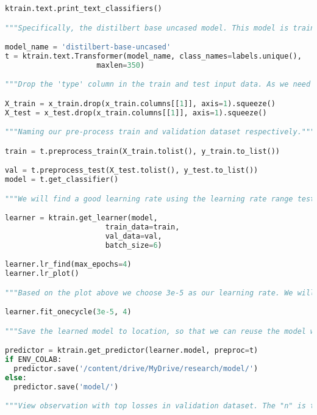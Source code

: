 \begin{lstlisting}[language=Python]
ktrain.text.print_text_classifiers()

"""Specifically, the distilbert base uncased model. This model is trained on uncased English words."""

model_name = 'distilbert-base-uncased'
t = ktrain.text.Transformer(model_name, class_names=labels.unique(),
                     maxlen=350)

"""Drop the 'type' column in the train and test input data. As we need only the domains to train our model. This type is needed in our train and test dataset later on to validate on each specific DGA familytype."""

X_train = x_train.drop(x_train.columns[[1]], axis=1).squeeze()
X_test = x_test.drop(x_train.columns[[1]], axis=1).squeeze()

"""Naming our pre-process train and validation dataset respectively."""

train = t.preprocess_train(X_train.tolist(), y_train.to_list())

val = t.preprocess_test(X_test.tolist(), y_test.to_list())
model = t.get_classifier()

"""We will find a good learning rate using the learning rate range test to provide valuable information about an optimal learnign rate. To point has to be chosen at which the loss starts descending and the point at which the loss stops descending or becomes ragged. For BERT and DistilBERT models the learning rate that Google recommends is between 5e-5 and 2e-5."""

learner = ktrain.get_learner(model,
                       train_data=train,
                       val_data=val,
                       batch_size=6)

learner.lr_find(max_epochs=4)
learner.lr_plot()

"""Based on the plot above we choose 3e-5 as our learning rate. We will fit a model follwing the 1cycle policy."""

learner.fit_onecycle(3e-5, 4)

"""Save the learned model to location, so that we can reuse the model without training our dataset again."""

predictor = ktrain.get_predictor(learner.model, preproc=t)
if ENV_COLAB:
  predictor.save('/content/drive/MyDrive/research/model/')
else: 
  predictor.save('model/')

"""View observation with top losses in validation dataset. The "n" is the amount of top losses we want to observe."""


\end{lstlisting}

